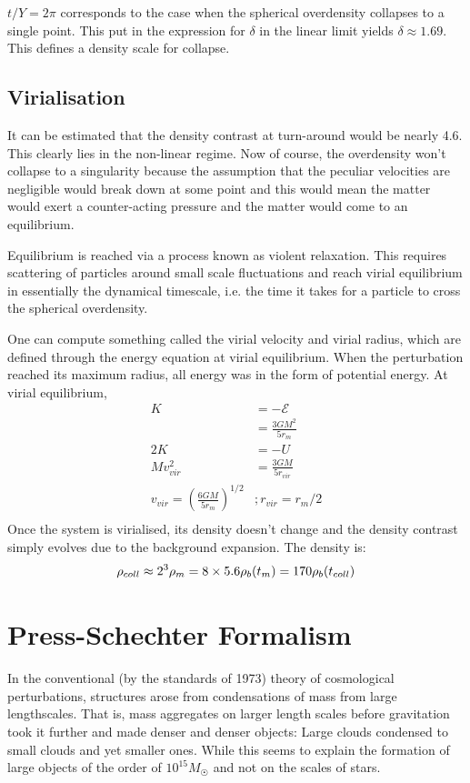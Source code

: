 \documentclass[12pt,a4paper,twoside]{book}
\begin{document}
			$t/Y=2\pi$ corresponds to the case when the spherical overdensity collapses to a single point. This put in the expression for $\delta$ in the linear limit yields $\delta\approx1.69$. This defines a density scale for collapse.
			
		\subsection{Virialisation}
			It can be estimated that the density contrast at turn-around would be nearly 4.6. This clearly lies in the non-linear regime. Now of course, the overdensity won't collapse to a singularity because the assumption that the peculiar velocities are negligible would break down at some point and this would mean the matter would exert a counter-acting pressure and the matter would come to an equilibrium.
			
			Equilibrium is reached via a process known as violent relaxation. This requires scattering of particles around small scale fluctuations and reach virial equilibrium in essentially the dynamical timescale, i.e. the time it takes for a particle to cross the spherical overdensity.
			
			One can compute something called the virial velocity and virial radius, which are defined through the energy equation at virial equilibrium. When the perturbation reached its maximum radius, all energy was in the form of potential energy. At virial equilibrium,
			$$
				\begin{aligned}
					K&=-\mathcal{E}\\
					 &=\frac{3GM^2}{5r_m}\\
				   2K&=-U\\
				   Mv_{vir}^2&=\frac{3GM}{5r_{vir}}\\
					v_{vir}=\left(\frac{6GM}{5r_m}\right)^{1/2}&;
					r_{vir}=r_m/2\\
				\end{aligned}
			$$
			Once the system is virialised, its density doesn't change and the density contrast simply evolves due to the background expansion. The density is:
			$$
				\rho_{coll}\approx 2^3\rho_m=8\times5.6\rho_b(t_{m})=170\rho_b(t_{coll})\\
			$$
	\section{Press-Schechter Formalism}
		In the conventional (by the standards of 1973) theory of cosmological perturbations,	structures arose from condensations of mass from large lengthscales. That is, mass aggregates on larger length scales before gravitation took it further and made denser and denser objects: Large clouds condensed to small clouds and yet smaller ones. While this seems to explain the formation of large objects of the order of $10^{15}M_\Sun$ and not on the scales of stars.
		
\end{document}
